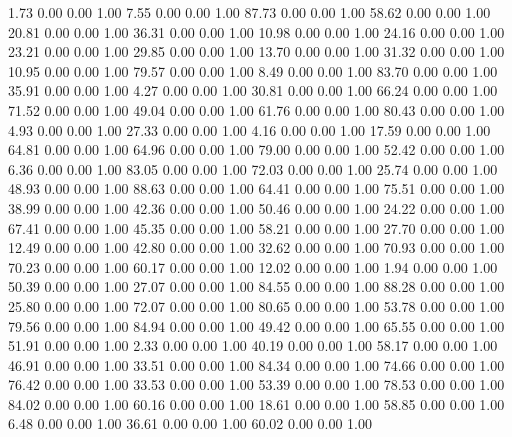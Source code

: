     1.73   0.00   0.00   1.00
    7.55   0.00   0.00   1.00
   87.73   0.00   0.00   1.00
   58.62   0.00   0.00   1.00
   20.81   0.00   0.00   1.00
   36.31   0.00   0.00   1.00
   10.98   0.00   0.00   1.00
   24.16   0.00   0.00   1.00
   23.21   0.00   0.00   1.00
   29.85   0.00   0.00   1.00
   13.70   0.00   0.00   1.00
   31.32   0.00   0.00   1.00
   10.95   0.00   0.00   1.00
   79.57   0.00   0.00   1.00
    8.49   0.00   0.00   1.00
   83.70   0.00   0.00   1.00
   35.91   0.00   0.00   1.00
    4.27   0.00   0.00   1.00
   30.81   0.00   0.00   1.00
   66.24   0.00   0.00   1.00
   71.52   0.00   0.00   1.00
   49.04   0.00   0.00   1.00
   61.76   0.00   0.00   1.00
   80.43   0.00   0.00   1.00
    4.93   0.00   0.00   1.00
   27.33   0.00   0.00   1.00
    4.16   0.00   0.00   1.00
   17.59   0.00   0.00   1.00
   64.81   0.00   0.00   1.00
   64.96   0.00   0.00   1.00
   79.00   0.00   0.00   1.00
   52.42   0.00   0.00   1.00
    6.36   0.00   0.00   1.00
   83.05   0.00   0.00   1.00
   72.03   0.00   0.00   1.00
   25.74   0.00   0.00   1.00
   48.93   0.00   0.00   1.00
   88.63   0.00   0.00   1.00
   64.41   0.00   0.00   1.00
   75.51   0.00   0.00   1.00
   38.99   0.00   0.00   1.00
   42.36   0.00   0.00   1.00
   50.46   0.00   0.00   1.00
   24.22   0.00   0.00   1.00
   67.41   0.00   0.00   1.00
   45.35   0.00   0.00   1.00
   58.21   0.00   0.00   1.00
   27.70   0.00   0.00   1.00
   12.49   0.00   0.00   1.00
   42.80   0.00   0.00   1.00
   32.62   0.00   0.00   1.00
   70.93   0.00   0.00   1.00
   70.23   0.00   0.00   1.00
   60.17   0.00   0.00   1.00
   12.02   0.00   0.00   1.00
    1.94   0.00   0.00   1.00
   50.39   0.00   0.00   1.00
   27.07   0.00   0.00   1.00
   84.55   0.00   0.00   1.00
   88.28   0.00   0.00   1.00
   25.80   0.00   0.00   1.00
   72.07   0.00   0.00   1.00
   80.65   0.00   0.00   1.00
   53.78   0.00   0.00   1.00
   79.56   0.00   0.00   1.00
   84.94   0.00   0.00   1.00
   49.42   0.00   0.00   1.00
   65.55   0.00   0.00   1.00
   51.91   0.00   0.00   1.00
    2.33   0.00   0.00   1.00
   40.19   0.00   0.00   1.00
   58.17   0.00   0.00   1.00
   46.91   0.00   0.00   1.00
   33.51   0.00   0.00   1.00
   84.34   0.00   0.00   1.00
   74.66   0.00   0.00   1.00
   76.42   0.00   0.00   1.00
   33.53   0.00   0.00   1.00
   53.39   0.00   0.00   1.00
   78.53   0.00   0.00   1.00
   84.02   0.00   0.00   1.00
   60.16   0.00   0.00   1.00
   18.61   0.00   0.00   1.00
   58.85   0.00   0.00   1.00
    6.48   0.00   0.00   1.00
   36.61   0.00   0.00   1.00
   60.02   0.00   0.00   1.00
